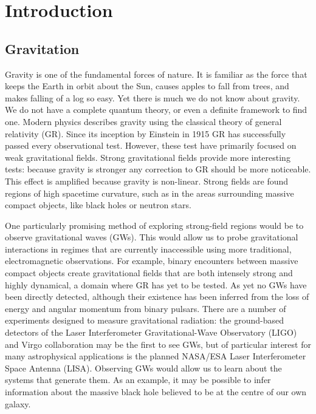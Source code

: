 \chapter{Introduction}\setcounter{page}{1}

\section{Gravitation}

Gravity is one of the fundamental forces of nature. It is familiar as the force that keeps the Earth in orbit about the Sun, causes apples to fall from trees, and makes falling of a log so easy. Yet there is much we do not know about gravity. We do not have a complete quantum theory, or even a definite framework to find one. Modern physics describes gravity using the classical theory of general relativity (GR)\cite{Misner1973}. Since its inception by Einstein in 1915 GR has successfully passed every observational test\cite{Will2006}. However, these test have primarily focused on weak gravitational fields. Strong gravitational fields provide more interesting tests: because gravity is stronger any correction to GR should be more noticeable. This effect is amplified because gravity is non-linear. Strong fields are found regions of high spacetime curvature, such as in the areas surrounding massive compact objects, like black holes or neutron stars.

One particularly promising method of exploring strong-field regions would be to observe gravitational waves (GWs). This would allow us to probe gravitational interactions in regimes that are currently inaccessible using more traditional, electromagnetic observations. For example, binary encounters between massive compact objects create gravitational fields that are both intensely strong and highly dynamical, a domain where GR has yet to be tested. As yet no GWs have been directly detected, although their existence has been inferred from the loss of energy and angular momentum from binary pulsars\cite{Stairs2003}. There are a number of experiments designed to measure gravitational radiation: the ground-based detectors of the Laser Interferometer Gravitational-Wave Observatory (LIGO)\cite{Abramovici1992, Abbott2009} and Virgo\cite{Accadia2010} collaboration may be the first to see GWs, but of particular interest for many astrophysical applications is the planned NASA/ESA Laser Interferometer Space Antenna (LISA)\cite{Bender1998,Danzmann2003}. Observing GWs would allow us to learn about the systems that generate them. As an example, it may be possible to infer information about the massive black hole believed to be at the centre of our own galaxy.

